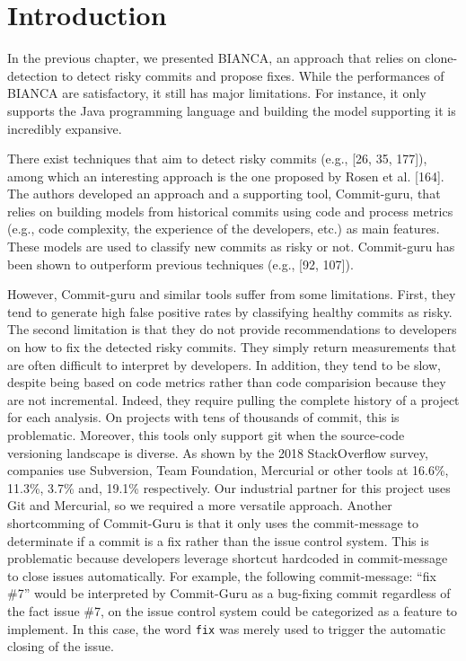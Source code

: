 \documentclass[12pt]{report}
\begin{document}
\section{Introduction}\label{introduction-4}

In the previous chapter, we presented BIANCA, an approach that relies on
clone-detection to detect risky commits and propose fixes. While the
performances of BIANCA are satisfactory, it still has major limitations.
For instance, it only supports the Java programming language and
building the model supporting it is incredibly expansive.

There exist techniques that aim to detect risky commits (e.g., {[}26,
35, 177{]}), among which an interesting approach is the one proposed by
Rosen et al. {[}164{]}. The authors developed an approach and a
supporting tool, Commit-guru, that relies on building models from
historical commits using code and process metrics (e.g., code
complexity, the experience of the developers, etc.) as main features.
These models are used to classify new commits as risky or not.
Commit-guru has been shown to outperform previous techniques (e.g.,
{[}92, 107{]}).

However, Commit-guru and similar tools suffer from some limitations.
First, they tend to generate high false positive rates by classifying
healthy commits as risky. The second limitation is that they do not
provide recommendations to developers on how to fix the detected risky
commits. They simply return measurements that are often difficult to
interpret by developers. In addition, they tend to be slow, despite
being based on code metrics rather than code comparision because they
are not incremental. Indeed, they require pulling the complete history
of a project for each analysis. On projects with tens of thousands of
commit, this is problematic. Moreover, this tools only support git when
the source-code versioning landscape is diverse. As shown by the 2018
StackOverflow survey, companies use Subversion, Team Foundation,
Mercurial or other tools at 16.6\%, 11.3\%, 3.7\% and, 19.1\%
respectively. Our industrial partner for this project uses Git and
Mercurial, so we required a more versatile approach. Another
shortcomming of Commit-Guru is that it only uses the commit-message to
determinate if a commit is a fix rather than the issue control system.
This is problematic because developers leverage shortcut hardcoded in
commit-message to close issues automatically. For example, the following
commit-message: ``fix \#7'' would be interpreted by Commit-Guru as a
bug-fixing commit regardless of the fact issue \#7, on the issue control
system could be categorized as a feature to implement. In this case, the
word \lstinline!fix! was merely used to trigger the automatic closing of
the issue.
\end{document}
